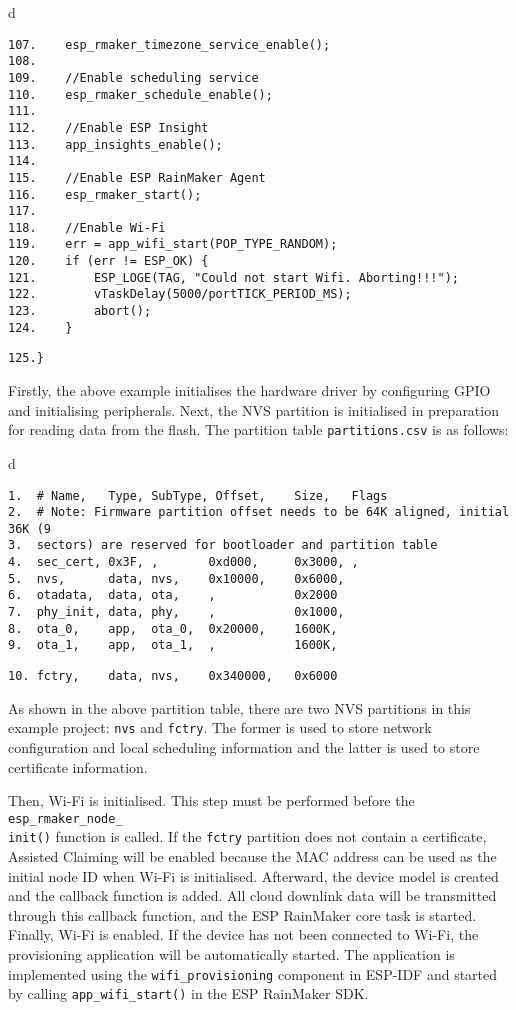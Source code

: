 \documentclass[a4paper,12pt]{book}
\begin{document}
\begin{codebloc}
\begin{tabular}{d}
\vspace{2pt}
\begin{verbatim}
107.    esp_rmaker_timezone_service_enable();
108.
109.    //Enable scheduling service
110.    esp_rmaker_schedule_enable();
111.
112.    //Enable ESP Insight
113.    app_insights_enable();
114.
115.    //Enable ESP RainMaker Agent
116.    esp_rmaker_start();
117.
118.    //Enable Wi-Fi
119.    err = app_wifi_start(POP_TYPE_RANDOM);
120.    if (err != ESP_OK) {
121.        ESP_LOGE(TAG, "Could not start Wifi. Aborting!!!");
122.        vTaskDelay(5000/portTICK_PERIOD_MS);
123.        abort();
124.    }
\end{verbatim}
\verb|125.}|
\end{tabular}
\end{codebloc}

Firstly, the above example initialises the hardware driver by configuring GPIO and initialising peripherals. Next, the NVS partition is initialised in preparation for reading data from the flash. The partition table \verb|partitions.csv| is as follows:

\begin{codebloc}
\begin{tabular}{d}
\vspace{2pt}
\begin{verbatim}
1.  # Name,   Type, SubType, Offset,    Size,   Flags
2.  # Note: Firmware partition offset needs to be 64K aligned, initial 36K (9 
3.  sectors) are reserved for bootloader and partition table
4.  sec_cert, 0x3F, ,       0xd000,     0x3000, ,
5.  nvs,      data, nvs,    0x10000,    0x6000,
6.  otadata,  data, ota,    ,           0x2000
7.  phy_init, data, phy,    ,           0x1000,
8.  ota_0,    app,  ota_0,  0x20000,    1600K,
9.  ota_1,    app,  ota_1,  ,           1600K,
\end{verbatim}
\verb|10. fctry,    data, nvs,    0x340000,   0x6000|
\end{tabular}
\end{codebloc}

As shown in the above partition table, there are two NVS partitions in this example project: \verb|nvs| and \verb|fctry|. The former is used to store network configuration and local scheduling information and the latter is used to store certificate information.

Then, Wi-Fi is initialised. This step must be performed before the \verb|esp_rmaker_node_|\\ \verb|init()| function is called. If the \verb|fctry| partition does not contain a certificate, Assisted Claiming will be enabled because the MAC address can be used as the initial node ID when Wi-Fi is initialised. Afterward, the device model is created and the callback function is added. All cloud downlink data will be transmitted through this callback function, and the ESP RainMaker core task is started. Finally, Wi-Fi is enabled. If the device has not been connected to Wi-Fi, the provisioning application will be automatically started. The application is implemented using the \verb|wifi_provisioning| component in ESP-IDF and started by calling \verb|app_wifi_start()| in the ESP RainMaker SDK.
\end{document}
